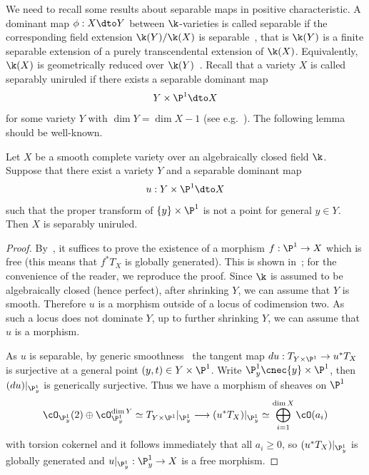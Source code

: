We need to recall some results about separable maps in positive characteristic.
A dominant map $\phi: X \dto Y$ between $\k$-varieties
is called separable if the
corresponding field extension $\k(Y)/\k(X)$
is separable~\cite[\href{https://stacks.math.columbia.edu/tag/030I}{Tag 030I}]{stacks-project},
that is $\k(Y)$ is a finite
separable extension of a purely transcendental extension of
$\k(X)$.
Equivalently,
$\k(X)$ is geometrically
reduced over $\k(Y)$~\cite[\href{https://stacks.math.columbia.edu/tag/05DT}{Tag 05DT}]{stacks-project}.
Recall that a variety $X$ is called separably uniruled
if there exists a
separable
dominant map
$$Y \times \P^1 \dto X$$
for some variety $Y$ with $\dim Y = \dim X - 1$
(see e.g.~\cite[Definition IV.1.1]{Kollarrat}).
The following lemma should be well-known.

\begin{lem}
\notready\label{lem-defSU}
Let $X$ be a smooth complete variety over an algebraically closed field $\k$.
Suppose that there exist a variety $Y$ and
a separable dominant map
$$u: Y \times \P^1 \dto X$$
such that the proper transform of $\{y\} \times \P^1$
is not a point for general $y \in Y$.
Then $X$ is separably uniruled.
\end{lem}

\begin{proof}
By~\cite[Theorem IV.1.9]{Kollarrat},
it suffices to prove the existence of a
morphism
$f : \P^1 \to X$
which is free (this means that $f^*T_X$
is globally generated).
This is shown in~\cite[Lemma 1.2]{MR977778};
for the convenience of the reader, we reproduce the proof.
Since $\k$ is assumed
to be algebraically closed
(hence perfect), after shrinking $Y$, we can assume that $Y$ is smooth.
Therefore $u$ is a morphism outside of a locus of codimension two.
As such a locus does not dominate $Y$,
up to further shrinking $Y$,
we can assume that $u$ is a morphism.

As $u$ is separable, by generic smoothness~\cite[\href{https://stacks.math.columbia.edu/tag/056V}{Tag 056V}]{stacks-project}
the tangent map $du : T_{Y \times \P^1} \to u^*T_X$
is surjective at a general point $(y,t) \in Y \times \P^1$.
Write $\P^1_y \cnec \{y\} \times \P^1$, then
$(du)|_{\P_y^1}$ is generically surjective.
Thus
we have
a morphism of sheaves on $\P^1$
\[
\cO_{\P_y^1}(2) \oplus \cO_{\P_y^1}^{\dim Y} \simeq
T_{Y \times \P^1}|_{\P^1_y}  \longrightarrow
(u^*T_X)|_{\P^1_y} \simeq
\bigoplus_{i = 1}^{\dim X} \cO(a_i)
\]
with torsion cokernel
and it follows immediately
that
all
$a_i \ge 0$, so
$(u^*T_X)|_{\P^1_y}$
is globally generated
and $u|_{\P^1_y} : \P^1_y \to X$ is a free morphism.
\end{proof}

